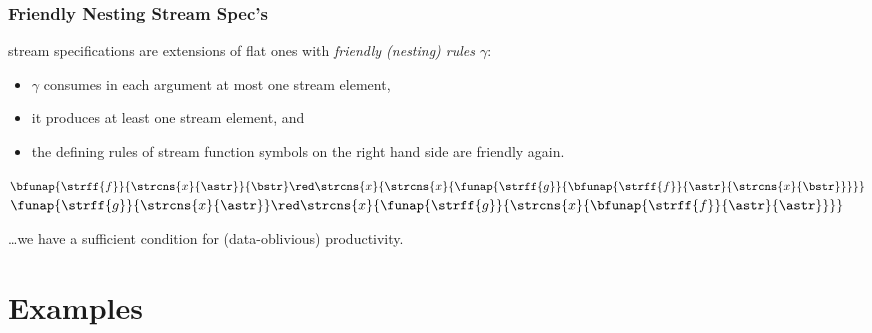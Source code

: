 \documentclass[10pt]{beamer}
\begin{document}
\begin{frame}%
  \frametitle{Friendly Nesting Stream Spec's}

 stream specifications are extensions
of flat ones with \emph{friendly (nesting) rules $\gamma$}:
%
\begin{itemize}
  \item $\gamma$ consumes in each argument at most one stream element,
  \item it produces at least one stream element, and
  \item the defining rules of stream function symbols on the right hand side are friendly again.
\end{itemize}

\begin{example}
\vspace{-1ex}
\begin{center}
  $\bfunap{\strff{f}}{\strcns{x}{\astr}}{\bstr} \red 
   \strcns{x}{\strcns{x}{\funap{\strff{g}}{\bfunap{\strff{f}}{\astr}{\strcns{x}{\bstr}}}}}$ \\[0.5ex]
  $\funap{\strff{g}}{\strcns{x}{\astr}} \red
   \strcns{x}{\funap{\strff{g}}{\strcns{x}{\bfunap{\strff{f}}{\astr}{\astr}}}}$
\end{center}
\vspace{-1ex}
\end{example}

\begin{theorem}
  \ldots we have a sufficient condition for (data-oblivious) productivity.
\end{theorem}

\end{frame}%

\section{Examples}
\end{document}
